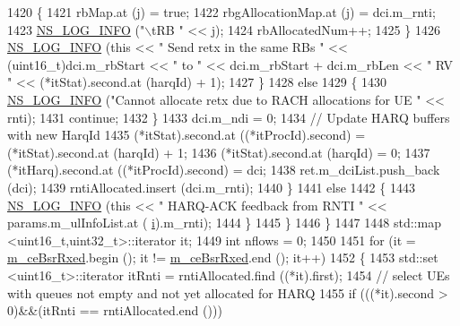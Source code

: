 \begin{DoxyCode}
1420                     \{
1421                       rbMap.at (j) = \textcolor{keyword}{true};
1422                       rbgAllocationMap.at (j) = dci.m\_rnti;
1423                       \hyperlink{group__logging_gafbd73ee2cf9f26b319f49086d8e860fb}{NS\_LOG\_INFO} (\textcolor{stringliteral}{"\(\backslash\)tRB "} << j);
1424                       rbAllocatedNum++;
1425                     \}
1426                   \hyperlink{group__logging_gafbd73ee2cf9f26b319f49086d8e860fb}{NS\_LOG\_INFO} (\textcolor{keyword}{this} << \textcolor{stringliteral}{" Send retx in the same RBs "} << (uint16\_t)dci.m\_rbStart 
      << \textcolor{stringliteral}{" to "} << dci.m\_rbStart + dci.m\_rbLen << \textcolor{stringliteral}{" RV "} << (*itStat).second.at (harqId) + 1);
1427                 \}
1428               \textcolor{keywordflow}{else}
1429                 \{
1430                   \hyperlink{group__logging_gafbd73ee2cf9f26b319f49086d8e860fb}{NS\_LOG\_INFO} (\textcolor{stringliteral}{"Cannot allocate retx due to RACH allocations for UE "} << rnti);
1431                   \textcolor{keywordflow}{continue};
1432                 \}
1433               dci.m\_ndi = 0;
1434               \textcolor{comment}{// Update HARQ buffers with new HarqId}
1435               (*itStat).second.at ((*itProcId).second) = (*itStat).second.at (harqId) + 1;
1436               (*itStat).second.at (harqId) = 0;
1437               (*itHarq).second.at ((*itProcId).second) = dci;
1438               ret.m\_dciList.push\_back (dci);
1439               rntiAllocated.insert (dci.m\_rnti);
1440             \}
1441             \textcolor{keywordflow}{else}
1442             \{
1443               \hyperlink{group__logging_gafbd73ee2cf9f26b319f49086d8e860fb}{NS\_LOG\_INFO} (\textcolor{keyword}{this} << \textcolor{stringliteral}{" HARQ-ACK feedback from RNTI "} << params.m\_ulInfoList.at (
      \hyperlink{bernuolliDistribution_8m_a6f6ccfcf58b31cb6412107d9d5281426}{i}).m\_rnti);
1444             \}
1445         \}
1446     \}
1447 
1448   std::map <uint16\_t,uint32\_t>::iterator it;
1449   \textcolor{keywordtype}{int} nflows = 0;
1450 
1451   \textcolor{keywordflow}{for} (it = \hyperlink{classns3_1_1TdBetFfMacScheduler_ab10364d54dad2ec2afed0c168cdad4d3}{m\_ceBsrRxed}.begin (); it != \hyperlink{classns3_1_1TdBetFfMacScheduler_ab10364d54dad2ec2afed0c168cdad4d3}{m\_ceBsrRxed}.end (); it++)
1452     \{
1453       std::set <uint16\_t>::iterator itRnti = rntiAllocated.find ((*it).first);
1454       \textcolor{comment}{// select UEs with queues not empty and not yet allocated for HARQ}
1455       \textcolor{keywordflow}{if} (((*it).second > 0)&&(itRnti == rntiAllocated.end ()))

\end{DoxyCode}
